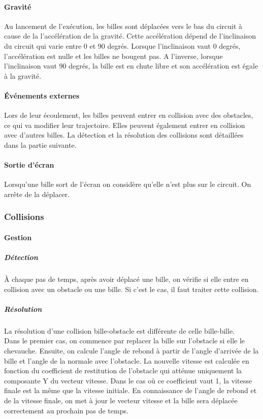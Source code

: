 \documentclass{report}
\begin{document}
\paragraph{Gravité}

Au lancement de l’exécution, les billes sont déplacées vers le bas du circuit à cause de la l’accélération de la gravité. Cette accélération dépend de l’inclinaison du circuit qui varie entre 0 et 90 degrés. Lorsque l’inclinaison vaut 0 degrés, l’accélération est nulle et les billes ne bougent pas. A l’inverse, lorsque l’inclinaison vaut 90 degrés, la bille est en chute libre et son accélération est égale à la gravité.

\paragraph{Événements externes}

Lors de leur écoulement, les billes peuvent entrer en collision avec des obstacles, ce qui va modifier leur trajectoire. Elles peuvent également entrer en collision avec d’autres billes. La détection et la résolution des collisions sont détaillées dans la partie suivante.

\paragraph{Sortie d'écran}

Lorsqu’une bille sort de l’écran on considère qu’elle n’est plus sur le circuit. On arrête de la déplacer.

\subsubsection{Collisions}

\paragraph{Gestion}

\subparagraph{Détection}

À chaque pas de temps, après avoir déplacé une bille, on vérifie si elle entre en collision avec un obstacle ou une bille. Si c’est le cas, il faut traiter cette collision.

\subparagraph{Résolution}

La résolution d’une collision bille-obstacle est différente de celle bille-bille. \\

Dans le premier cas, on commence par replacer la bille sur l’obstacle si elle le chevauche. Ensuite, on calcule l’angle de rebond à partir de l’angle d’arrivée de la bille et l’angle de la normale avec l’obstacle. La nouvelle vitesse est calculée en fonction du coefficient de restitution de l’obstacle qui atténue uniquement la composante Y du vecteur vitesse. Dans le cas où ce coefficient vaut 1, la vitesse finale est la même que la vitesse initiale. En connaissance de l’angle de rebond et de la vitesse finale,  on met à jour le vecteur vitesse et la bille sera déplacée correctement au prochain pas de temps. \\
\end{document}

